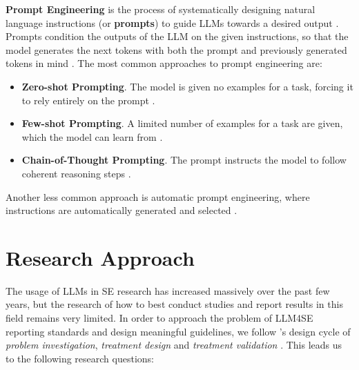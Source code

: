 \documentclass[a4paper]{article}
\begin{document}
\textbf{Prompt Engineering} is the process of systematically designing natural language instructions (or \textbf{prompts}) to guide LLMs towards a desired output \cite{ronanki2023}. Prompts condition the outputs of the LLM on the given instructions, so that the model generates the next tokens with both the prompt and previously generated tokens in mind \cite{jurafsky2025}. The most common approaches to prompt engineering are:
\begin{itemize}
    \item \textbf{Zero-shot Prompting}. The model is given no examples for a task, forcing it to rely entirely on the prompt \cite{radford2019language}.
    \item \textbf{Few-shot Prompting}. A limited number of examples for a task are given, which the model can learn from \cite{brown2020fewshot}.
    \item \textbf{Chain-of-Thought Prompting}. The prompt instructs the model to follow coherent reasoning steps \cite{wei2022chain}.
\end{itemize}
Another less common approach is automatic prompt engineering, where instructions are automatically generated and selected \cite{zhou2023ape}.

\section{Research Approach} \label{Research approach} 

The usage of LLMs in SE research has increased massively over the past few years, but the research of how to best conduct studies and report results in this field remains very limited. In order to approach the problem of LLM4SE reporting standards and design meaningful guidelines, we follow \citeauthor{Wieringa2014}'s design cycle of \textit{problem investigation}, \textit{treatment design} and \textit{treatment validation} \cite{Wieringa2014}. This leads us to the following research questions:
\end{document}
